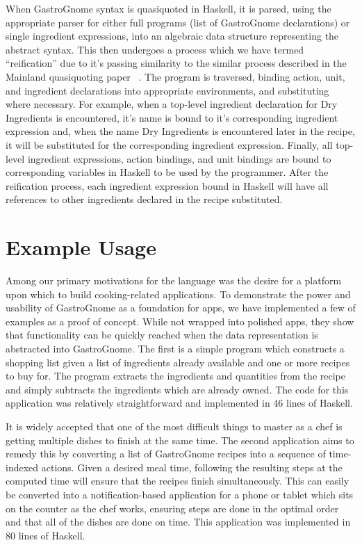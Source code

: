 \documentclass[pldi]{sigplanconf-pldi15}
\begin{document}
When GastroGnome syntax is quasiquoted in Haskell, it is parsed, using the
appropriate parser for either full programs (list of GastroGnome declarations)
or single ingredient expressions, into an algebraic data structure
representing the abstract syntax. This then undergoes a process which we have
termed “reification” due to it’s passing similarity to the similar process
described in the Mainland quasiquoting paper ~\cite{mainland07quasiquoting}.
The program is traversed, binding action, unit, and ingredient declarations
into appropriate environments, and substituting where necessary. For example,
when a top-level ingredient declaration for Dry Ingredients is encountered,
it’s name is bound to it’s corresponding ingredient expression and, when the 
name Dry Ingredients is encountered later in the recipe, it will be
substituted for the corresponding ingredient expression. Finally, all
top-level ingredient expressions, action bindings, and unit bindings are
bound to corresponding variables in Haskell to be used by the programmer.
After the reification process, each ingredient expression bound in Haskell
will have all references to other ingredients declared in the recipe
substituted.

\section{Example Usage}\label{sec:exampleusage}
Among our primary motivations for the language was the desire for a platform
upon which to build cooking-related applications. To demonstrate the power and
usability of GastroGnome as a foundation for apps, we have implemented a few
of examples as a proof of concept. While not wrapped into polished apps, they
show that functionality can be quickly reached when the data representation is
abstracted into GastroGnome.  The first is a simple program which constructs a
shopping list given a list of ingredients already available and one or more
recipes to buy for. The program extracts the ingredients and quantities from
the recipe and simply subtracts the ingredients which are already owned. The
code for this application was relatively straightforward and implemented in 46
lines of Haskell.

It is widely accepted that one of the most difficult things to master as a
chef is getting multiple dishes to finish at the same time. The second
application aims to remedy this by converting a list of GastroGnome recipes
into a sequence of time-indexed actions. Given a desired meal time, following
the resulting steps at the computed time will ensure that the recipes finish
simultaneously. This can easily be converted into a notification-based
application for a phone or tablet which sits on the counter as the chef works,
ensuring steps are done in the optimal order and that all of the dishes are
done on time. This application was implemented in 80 lines of Haskell.
\end{document}
